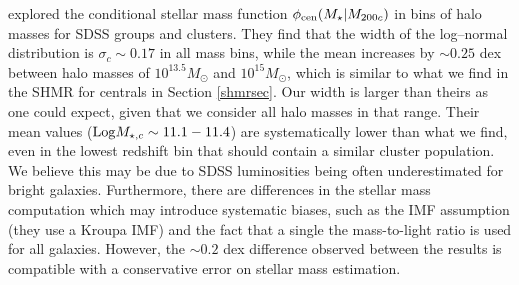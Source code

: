 {%
\citet{yang} explored the conditional stellar mass function $\phi_{\rm cen} (M_\star|M_{200c})$ in bins of halo masses for SDSS groups and clusters. They find that the width of the log--normal distribution is $\sigma_c\sim 0.17$ in all mass bins, while the mean increases by $\sim 0.25$ dex between halo masses of $10^{13.5}M_\odot$ and $10^{15}M_\odot$, which is similar to what we find in the SHMR for centrals in Section \ref{shmrsec}. Our width is larger than theirs as one could expect, given that we consider all halo masses in that range. Their mean values (${\rm Log}M_{\star,c}\sim 11.1-11.4$) are systematically lower than what we find, even in the lowest redshift bin that should contain a similar cluster population. We believe this may be due to SDSS luminosities being often underestimated for bright galaxies. Furthermore, there are differences in the stellar mass computation which may introduce systematic biases, such as the IMF assumption (they use a Kroupa IMF) and the fact that a single the mass-to-light ratio is used for all galaxies. However, the $\sim 0.2$ dex difference observed between the results is compatible with a conservative error on stellar mass estimation.

}
